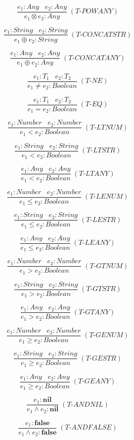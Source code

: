 \documentclass[12pt]{article}
\begin{document}
\[
\frac{e_{1}:Any \;\;\; e_{2}:Any}
     {e_{1} \otimes e_{2} : Any} \; (\textit{T-POWANY})
\]

\[
\frac{e_{1}:String \;\;\; e_{2}:String}
     {e_{1} \oplus e_{2} : String} \; (\textit{T-CONCATSTR})
\]

\[
\frac{e_{1}:Any \;\;\; e_{2}:Any}
     {e_{1} \oplus e_{2} : Any} \; (\textit{T-CONCATANY})
\]

\[
\frac{e_{1}:T_{1} \;\;\; e_{2}:T_{2}}
     {e_{1} \not= e_{2} : Boolean} \; (\textit{T-NE})
\]

\[
\frac{e_{1}:T_{1} \;\;\; e_{2}:T_{2}}
     {e_{1} = e_{2} : Boolean} \; (\textit{T-EQ})
\]

\[
\frac{e_{1}:Number \;\;\; e_{2}:Number}
     {e_{1} < e_{2} : Boolean} \; (\textit{T-LTNUM})
\]

\[
\frac{e_{1}:String \;\;\; e_{2}:String}
     {e_{1} < e_{2} : Boolean} \; (\textit{T-LTSTR})
\]

\[
\frac{e_{1}:Any \;\;\; e_{2}:Any}
     {e_{1} < e_{2} : Boolean} \; (\textit{T-LTANY})
\]

\[
\frac{e_{1}:Number \;\;\; e_{2}:Number}
     {e_{1} \le e_{2} : Boolean} \; (\textit{T-LENUM})
\]

\[
\frac{e_{1}:String \;\;\; e_{2}:String}
     {e_{1} \le e_{2} : Boolean} \; (\textit{T-LESTR})
\]

\[
\frac{e_{1}:Any \;\;\; e_{2}:Any}
     {e_{1} \le e_{2} : Boolean} \; (\textit{T-LEANY})
\]

\[
\frac{e_{1}:Number \;\;\; e_{2}:Number}
     {e_{1} > e_{2} : Boolean} \; (\textit{T-GTNUM})
\]

\[
\frac{e_{1}:String \;\;\; e_{2}:String}
     {e_{1} > e_{2} : Boolean} \; (\textit{T-GTSTR})
\]

\[
\frac{e_{1}:Any \;\;\; e_{2}:Any}
     {e_{1} > e_{2} : Boolean} \; (\textit{T-GTANY})
\]

\[
\frac{e_{1}:Number \;\;\; e_{2}:Number}
     {e_{1} \ge e_{2} : Boolean} \; (\textit{T-GENUM})
\]

\[
\frac{e_{1}:String \;\;\; e_{2}:String}
     {e_{1} \ge e_{2} : Boolean} \; (\textit{T-GESTR})
\]

\[
\frac{e_{1}:Any \;\;\; e_{2}:Any}
     {e_{1} \ge e_{2} : Boolean} \; (\textit{T-GEANY})
\]

\[
\frac{e_{1}:\textbf{nil}}
     {e_{1} \land e_{2} : \textbf{nil}} \; (\textit{T-ANDNIL})
\]

\[
\frac{e_{1}:\textbf{false}}
     {e_{1} \land e_{2} : \textbf{false}} \; (\textit{T-ANDFALSE})
\]
\end{document}
